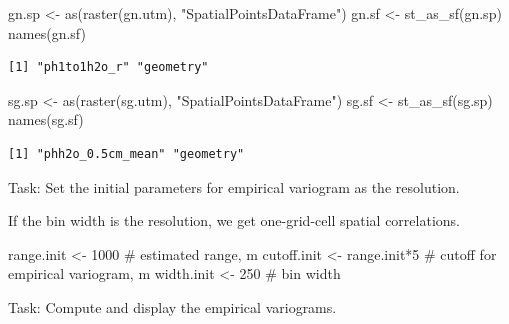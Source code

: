\documentclass[
  letterpaper,
  DIV=11,
  numbers=noendperiod]{scrartcl}
\newenvironment{Shaded}{\begin{snugshade}}{\end{snugshade}}
\newcommand{\CommentTok}[1]{\textcolor[rgb]{0.37,0.37,0.37}{#1}}
\newcommand{\DecValTok}[1]{\textcolor[rgb]{0.68,0.00,0.00}{#1}}
\newcommand{\FunctionTok}[1]{\textcolor[rgb]{0.28,0.35,0.67}{#1}}
\newcommand{\NormalTok}[1]{\textcolor[rgb]{0.00,0.23,0.31}{#1}}
\newcommand{\OtherTok}[1]{\textcolor[rgb]{0.00,0.23,0.31}{#1}}
\newcommand{\SpecialCharTok}[1]{\textcolor[rgb]{0.37,0.37,0.37}{#1}}
\newcommand{\StringTok}[1]{\textcolor[rgb]{0.13,0.47,0.30}{#1}}
\begin{document}
\begin{Shaded}
\begin{Highlighting}[]
\NormalTok{gn.sp }\OtherTok{\textless{}{-}} \FunctionTok{as}\NormalTok{(}\FunctionTok{raster}\NormalTok{(gn.utm), }\StringTok{"SpatialPointsDataFrame"}\NormalTok{)}
\NormalTok{gn.sf }\OtherTok{\textless{}{-}} \FunctionTok{st\_as\_sf}\NormalTok{(gn.sp)}
\FunctionTok{names}\NormalTok{(gn.sf)}
\end{Highlighting}
\end{Shaded}

\begin{verbatim}
[1] "ph1to1h2o_r" "geometry"   
\end{verbatim}

\begin{Shaded}
\begin{Highlighting}[]
\NormalTok{sg.sp }\OtherTok{\textless{}{-}} \FunctionTok{as}\NormalTok{(}\FunctionTok{raster}\NormalTok{(sg.utm), }\StringTok{"SpatialPointsDataFrame"}\NormalTok{)}
\NormalTok{sg.sf }\OtherTok{\textless{}{-}} \FunctionTok{st\_as\_sf}\NormalTok{(sg.sp)}
\FunctionTok{names}\NormalTok{(sg.sf)}
\end{Highlighting}
\end{Shaded}

\begin{verbatim}
[1] "phh2o_0.5cm_mean" "geometry"        
\end{verbatim}

Task: Set the initial parameters for empirical variogram as the
resolution.

If the bin width is the resolution, we get one-grid-cell spatial
correlations.

\begin{Shaded}
\begin{Highlighting}[]
\NormalTok{range.init }\OtherTok{\textless{}{-}} \DecValTok{1000}  \CommentTok{\# estimated range, m }
\NormalTok{cutoff.init }\OtherTok{\textless{}{-}}\NormalTok{ range.init}\SpecialCharTok{*}\DecValTok{5}  \CommentTok{\# cutoff for empirical variogram, m}
\NormalTok{width.init }\OtherTok{\textless{}{-}} \DecValTok{250}   \CommentTok{\# bin width}
\end{Highlighting}
\end{Shaded}

Task: Compute and display the empirical variograms.
\end{document}
